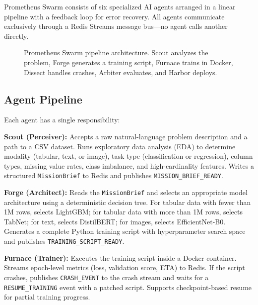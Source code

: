 \documentclass[conference]{IEEEtran}
\begin{document}
Prometheus Swarm consists of six specialized AI agents arranged in a linear pipeline
with a feedback loop for error recovery. All agents communicate exclusively through a
Redis Streams message bus---no agent calls another directly.

\begin{figure}[ht]
  \centering
  \caption{Prometheus Swarm pipeline architecture. Scout analyzes the problem, Forge
  generates a training script, Furnace trains in Docker, Dissect handles crashes,
  Arbiter evaluates, and Harbor deploys.}
  \label{fig:pipeline}
\end{figure}

\subsection{Agent Pipeline}

Each agent has a single responsibility:

\textbf{Scout (Perceiver):} Accepts a raw natural-language problem description and a
path to a CSV dataset. Runs exploratory data analysis (EDA) to determine modality
(tabular, text, or image), task type (classification or regression), column types,
missing value rates, class imbalance, and high-cardinality features. Writes a structured
\texttt{MissionBrief} to Redis and publishes \texttt{MISSION\_BRIEF\_READY}.

\textbf{Forge (Architect):} Reads the \texttt{MissionBrief} and selects an appropriate
model architecture using a deterministic decision tree. For tabular data with fewer than
1M rows, selects LightGBM; for tabular data with more than 1M rows, selects TabNet; for
text, selects DistilBERT; for images, selects EfficientNet-B0. Generates a complete
Python training script with hyperparameter search space and publishes
\texttt{TRAINING\_SCRIPT\_READY}.

\textbf{Furnace (Trainer):} Executes the training script inside a Docker container.
Streams epoch-level metrics (loss, validation score, ETA) to Redis. If the script
crashes, publishes \texttt{CRASH\_EVENT} to the crash stream and waits for a
\texttt{RESUME\_TRAINING} event with a patched script. Supports checkpoint-based resume
for partial training progress.
\end{document}

